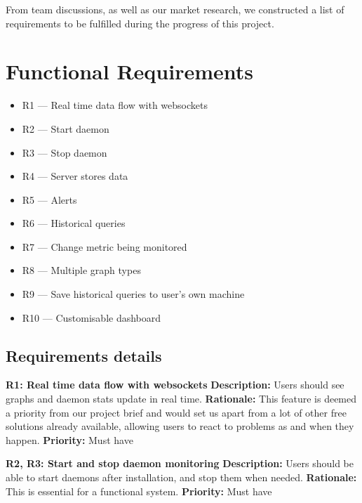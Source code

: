\documentclass{l3proj}
\begin{document}
From team discussions, as well as our market research, we constructed a list of requirements to be fulfilled during the progress of this project.

\section{Functional Requirements}
\label{requirements}



\begin{itemize}
  \item R1 --- Real time data flow with websockets
  \item R2 --- Start daemon
  \item R3 --- Stop daemon
  \item R4 --- Server stores data
  \item R5 --- Alerts
  \item R6 --- Historical queries
  \item R7 --- Change metric being monitored
  \item R8 --- Multiple graph types
  \item R9 --- Save historical queries to user's own machine
  \item R10 --- Customisable dashboard
\end{itemize}

\subsection{Requirements details}

\textbf{R1: Real time data flow with websockets} \newline
\textbf{Description:} Users should see graphs and daemon stats update in real time. \newline
\textbf{Rationale:} This feature is deemed a priority from our project brief and would set us apart from a lot of other free solutions already available, allowing users to react to problems as and when they happen. \newline
\textbf{Priority:} Must have

\textbf{R2, R3: Start and stop daemon monitoring} \newline
\textbf{Description:} Users should be able to start daemons after installation, and stop them when needed. \newline
\textbf{Rationale:} This is essential for a functional system. \newline
\textbf{Priority:} Must have
\end{document}
